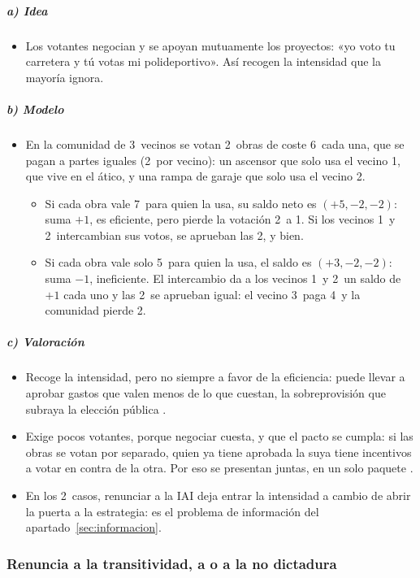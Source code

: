 \documentclass[11pt]{article}
\begin{document}
\subparagraph{a) Idea}

\begin{itemize}
\item Los votantes negocian y se apoyan mutuamente los proyectos: «yo voto tu carretera y tú votas mi polideportivo»\nocite{Tullock1959Problems}. Así recogen la intensidad que la mayoría ignora.
\end{itemize}

\subparagraph{b) Modelo}

\begin{itemize}
\item En la comunidad de 3~vecinos se votan 2~obras de coste 6~cada una, que se pagan a partes iguales (2~por vecino): un ascensor que solo usa el vecino 1, que vive en el ático, y una rampa de garaje que solo usa el vecino 2.
  \begin{itemize}
  \item Si cada obra vale 7~para quien la usa, su saldo neto es $(+5,-2,-2)$: suma $+1$, es eficiente, pero pierde la votación 2~a 1. Si los vecinos 1~y 2~intercambian sus votos, se aprueban las 2, y bien.
  \item Si cada obra vale solo 5~para quien la usa, el saldo es $(+3,-2,-2)$: suma $-1$, ineficiente. El intercambio da a los vecinos 1~y 2~un saldo de $+1$ cada uno y las 2~se aprueban igual: el vecino 3~paga 4~y la comunidad pierde 2.
  \end{itemize}
\end{itemize}

\subparagraph{c) Valoración}

\begin{itemize}
\item Recoge la intensidad, pero no siempre a favor de la eficiencia: puede llevar a aprobar gastos que valen menos de lo que cuestan, la sobreprovisión que subraya la elección pública .
\item Exige pocos votantes, porque negociar cuesta, y que el pacto se cumpla: si las obras se votan por separado, quien ya tiene aprobada la suya tiene incentivos a votar en contra de la otra. Por eso se presentan juntas, en un solo paquete .
\item En los 2~casos, renunciar a la IAI deja entrar la intensidad a cambio de abrir la puerta a la estrategia: es el problema de información del apartado~\ref{sec:informacion}.
\end{itemize}

\subsubsection{Renuncia a la transitividad, a  o a la no dictadura}\label{sec:renuncia-otros}
\end{document}
